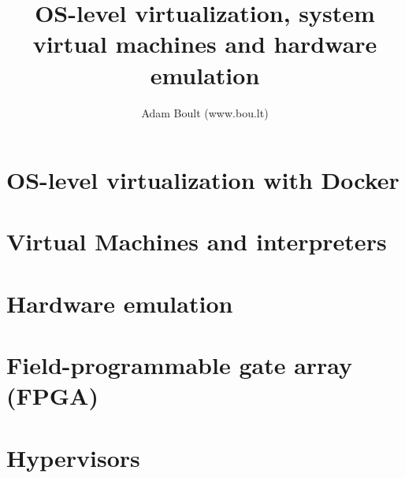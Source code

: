 \documentclass[oneside]{book}
\begin{document}
\author{Adam Boult (www.bou.lt)}
\title{OS-level virtualization, system virtual machines and hardware emulation}
\maketitle

\setcounter{tocdepth}{0}
\tableofcontents



\part{OS-level virtualization with Docker}


\part{Virtual Machines and interpreters}


\part{Hardware emulation}

\part{Field-programmable gate array (FPGA)}

\part{Hypervisors}
\end{document}
